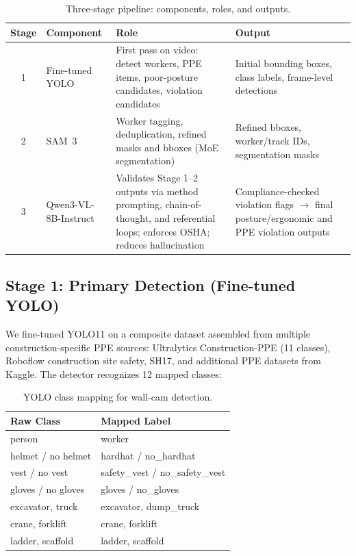 \documentclass[11pt, twocolumn]{article}
\begin{document}
\begin{table}[t]
\centering
\small
\caption{Three-stage pipeline: components, roles, and outputs.}
\label{tab:pipeline}
\begin{tabular}{cl p{5.2cm} p{4.8cm}}
\toprule
\textbf{Stage} & \textbf{Component} & \textbf{Role} & \textbf{Output} \\
\midrule
1 & Fine-tuned YOLO & First pass on video: detect workers, PPE items, poor-posture candidates, violation candidates & Initial bounding boxes, class labels, frame-level detections \\[3pt]
2 & SAM~3 & Worker tagging, deduplication, refined masks and bboxes (MoE segmentation) & Refined bboxes, worker/track IDs, segmentation masks \\[3pt]
3 & Qwen3-VL-8B-Instruct & Validates Stage 1--2 outputs via method prompting, chain-of-thought, and referential loops; enforces OSHA; reduces hallucination & Compliance-checked violation flags $\rightarrow$ final posture/ergonomic and PPE violation outputs \\
\bottomrule
\end{tabular}
\end{table}

\subsection{Stage 1: Primary Detection (Fine-tuned YOLO)}

We fine-tuned YOLO11 on a composite dataset assembled from multiple construction-specific PPE sources: Ultralytics Construction-PPE (11 classes), Roboflow construction site safety, SH17, and additional PPE datasets from Kaggle. The detector recognizes 12 mapped classes:

\begin{table}[H]
\centering
\small
\caption{YOLO class mapping for wall-cam detection.}
\begin{tabular}{ll}
\toprule
\textbf{Raw Class} & \textbf{Mapped Label} \\
\midrule
person & worker \\
helmet / no helmet & hardhat / no\_hardhat \\
vest / no vest & safety\_vest / no\_safety\_vest \\
gloves / no gloves & gloves / no\_gloves \\
excavator, truck & excavator, dump\_truck \\
crane, forklift & crane, forklift \\
ladder, scaffold & ladder, scaffold \\
\bottomrule
\end{tabular}
\end{table}
\end{document}
